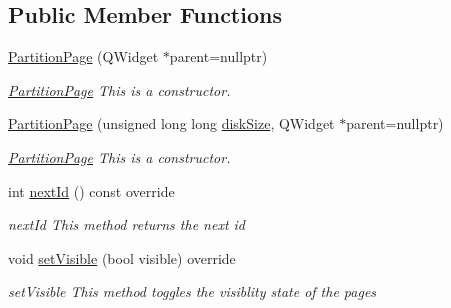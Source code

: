 \subsection*{Public Member Functions}
\begin{DoxyCompactItemize}
\item 
\mbox{\hyperlink{class_partition_page_a0d12fa168dd41719b3d70cb2effd3629}{Partition\+Page}} (Q\+Widget $\ast$parent=nullptr)
\begin{DoxyCompactList}\small\item\em \mbox{\hyperlink{class_partition_page}{Partition\+Page}} This is a constructor. \end{DoxyCompactList}\item 
\mbox{\hyperlink{class_partition_page_a426e777d0785c6992bcfa8a1badd242e}{Partition\+Page}} (unsigned long long \mbox{\hyperlink{class_partition_page_ad564ff04040e97b842785ba79c1ca2fe}{disk\+Size}}, Q\+Widget $\ast$parent=nullptr)
\begin{DoxyCompactList}\small\item\em \mbox{\hyperlink{class_partition_page}{Partition\+Page}} This is a constructor. \end{DoxyCompactList}\item 
int \mbox{\hyperlink{class_partition_page_a63ae270155bc6d01ae83adf63860d6f9}{next\+Id}} () const override
\begin{DoxyCompactList}\small\item\em next\+Id This method returns the next id \end{DoxyCompactList}\item 
void \mbox{\hyperlink{class_partition_page_a105573c5cd7af63d8425672c45d2540f}{set\+Visible}} (bool visible) override
\begin{DoxyCompactList}\small\item\em set\+Visible This method toggles the visiblity state of the pages \end{DoxyCompactList}\end{DoxyCompactItemize}
